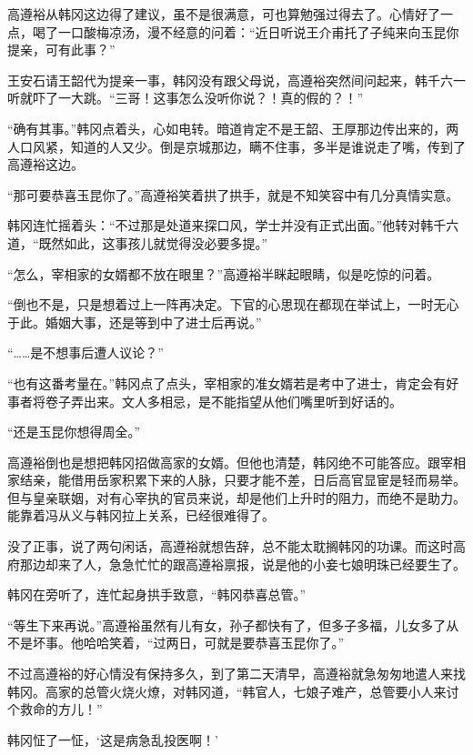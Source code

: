 高遵裕从韩冈这边得了建议，虽不是很满意，可也算勉强过得去了。心情好了一点，喝了一口酸梅凉汤，漫不经意的问着：“近日听说王介甫托了子纯来向玉昆你提亲，可有此事？”

王安石请王韶代为提亲一事，韩冈没有跟父母说，高遵裕突然间问起来，韩千六一听就吓了一大跳。“三哥！这事怎么没听你说？！真的假的？！”

“确有其事。”韩冈点着头，心如电转。暗道肯定不是王韶、王厚那边传出来的，两人口风紧，知道的人又少。倒是京城那边，瞒不住事，多半是谁说走了嘴，传到了高遵裕这边。

“那可要恭喜玉昆你了。”高遵裕笑着拱了拱手，就是不知笑容中有几分真情实意。

韩冈连忙摇着头：“不过那是处道来探口风，学士并没有正式出面。”他转对韩千六道，“既然如此，这事孩儿就觉得没必要多提。”

“怎么，宰相家的女婿都不放在眼里？”高遵裕半眯起眼睛，似是吃惊的问着。

“倒也不是，只是想着过上一阵再决定。下官的心思现在都现在举试上，一时无心于此。婚姻大事，还是等到中了进士后再说。”

“……是不想事后遭人议论？”

“也有这番考量在。”韩冈点了点头，宰相家的准女婿若是考中了进士，肯定会有好事者将卷子弄出来。文人多相忌，是不能指望从他们嘴里听到好话的。

“还是玉昆你想得周全。”

高遵裕倒也是想把韩冈招做高家的女婿。但他也清楚，韩冈绝不可能答应。跟宰相家结亲，能借用岳家积累下来的人脉，只要才能不差，日后高官显宦是轻而易举。但与皇亲联姻，对有心宰执的官员来说，却是他们上升时的阻力，而绝不是助力。能靠着冯从义与韩冈拉上关系，已经很难得了。

没了正事，说了两句闲话，高遵裕就想告辞，总不能太耽搁韩冈的功课。而这时高府那边却来了人，急急忙忙的跟高遵裕禀报，说是他的小妾七娘明珠已经要生了。

韩冈在旁听了，连忙起身拱手致意，“韩冈恭喜总管。”

“等生下来再说。”高遵裕虽然有儿有女，孙子都快有了，但多子多福，儿女多了从不是坏事。他哈哈笑着，“过两日，可就是要恭喜玉昆你了。”

不过高遵裕的好心情没有保持多久，到了第二天清早，高遵裕就急匆匆地遣人来找韩冈。高家的总管火烧火燎，对韩冈道，“韩官人，七娘子难产，总管要小人来讨个救命的方儿！”

韩冈怔了一怔，‘这是病急乱投医啊！’

